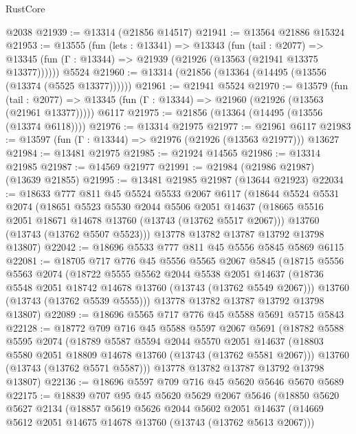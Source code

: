 \begin{lexlean}{RustCore}
\begin{coremodule}
    @2038
@21939 := @13314 (@21856 @14517)
@21941 := @13564 @21886 @15324
@21953 := @13555
    (fun (lets : @13341) =>
    @13343
      (fun (tail : @2077) =>
      @13345 (fun (Γ : @13344) => @21939 (@21926 (@13563 (@21941 @13375 @13377))))))
    @5524
@21960 := @13314 (@21856 (@13364 (@14495 (@13556 (@13374 (@5525 @13377))))))
@21961 := @21941 @5524
@21970 := @13579
    (fun (tail : @2077) => @13345 (fun (Γ : @13344) => @21960 (@21926 (@13563 (@21961 @13377)))))
    @6117
@21975 := @21856 (@13364 (@14495 (@13556 (@13374 @6118))))
@21976 := @13314 @21975
@21977 := @21961 @6117
@21983 := @13597 (fun (Γ : @13344) => @21976 (@21926 (@13563 @21977))) @13627
@21984 := @13481 @21975
@21985 := @21924 @14565
@21986 := @13314 @21985
@21987 := @14569 @21977
@21991 := @21984 (@21986 @21987) (@13639 @21855)
@21995 := @13481 @21985 @21987 (@13644 @21923)
@22034 := @18633
    @777
    @811
    @45
    @5524
    @5533
    @2067
    @6117
    (@18644
      @5524
      @5531
      @2074
      (@18651
        @5523
        @5530
        @2044
        @5506
        @2051
        @14637
        (@18665 @5516 @2051 @18671 @14678 @13760 (@13743 (@13762 @5517 @2067)))
        @13760
        (@13743 (@13762 @5507 @5523)))
      @13778
      @13782
      @13787
      @13792
      @13798
      @13807)
@22042 := @18696 @5533 @777 @811 @45 @5556 @5845 @5869 @6115
@22081 := @18705
    @717
    @776
    @45
    @5556
    @5565
    @2067
    @5845
    (@18715
      @5556
      @5563
      @2074
      (@18722
        @5555
        @5562
        @2044
        @5538
        @2051
        @14637
        (@18736 @5548 @2051 @18742 @14678 @13760 (@13743 (@13762 @5549 @2067)))
        @13760
        (@13743 (@13762 @5539 @5555)))
      @13778
      @13782
      @13787
      @13792
      @13798
      @13807)
@22089 := @18696 @5565 @717 @776 @45 @5588 @5691 @5715 @5843
@22128 := @18772
    @709
    @716
    @45
    @5588
    @5597
    @2067
    @5691
    (@18782
      @5588
      @5595
      @2074
      (@18789
        @5587
        @5594
        @2044
        @5570
        @2051
        @14637
        (@18803 @5580 @2051 @18809 @14678 @13760 (@13743 (@13762 @5581 @2067)))
        @13760
        (@13743 (@13762 @5571 @5587)))
      @13778
      @13782
      @13787
      @13792
      @13798
      @13807)
@22136 := @18696 @5597 @709 @716 @45 @5620 @5646 @5670 @5689
@22175 := @18839
    @707
    @95
    @45
    @5620
    @5629
    @2067
    @5646
    (@18850
      @5620
      @5627
      @2134
      (@18857
        @5619
        @5626
        @2044
        @5602
        @2051
        @14637
        (@14669 @5612 @2051 @14675 @14678 @13760 (@13743 (@13762 @5613 @2067)))

\end{coremodule}
\end{lexlean}
